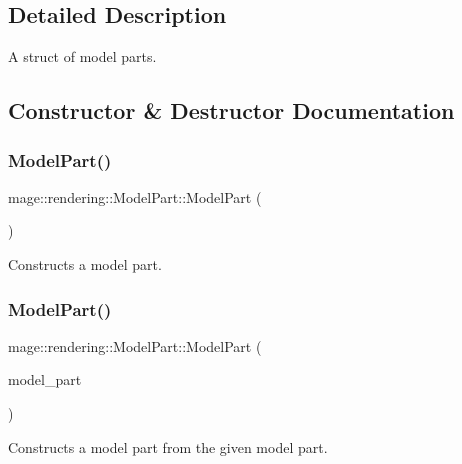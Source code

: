 \subsection{Detailed Description}
A struct of model parts. 

\subsection{Constructor \& Destructor Documentation}
\hypertarget{structmage_1_1rendering_1_1_model_part_adb7271a00583f72324ab37ab7e668689}{}\label{structmage_1_1rendering_1_1_model_part_adb7271a00583f72324ab37ab7e668689} 
\subsubsection{\texorpdfstring{Model\+Part()}{ModelPart()}\hspace{0.1cm}{\footnotesize\ttfamily [1/3]}}
{\footnotesize\ttfamily mage\+::rendering\+::\+Model\+Part\+::\+Model\+Part (\begin{DoxyParamCaption}{ }\end{DoxyParamCaption})}

Constructs a model part. \hypertarget{structmage_1_1rendering_1_1_model_part_ab9f9bbf4d5a08113483d3744b69e7188}{}\label{structmage_1_1rendering_1_1_model_part_ab9f9bbf4d5a08113483d3744b69e7188} 
\subsubsection{\texorpdfstring{Model\+Part()}{ModelPart()}\hspace{0.1cm}{\footnotesize\ttfamily [2/3]}}
{\footnotesize\ttfamily mage\+::rendering\+::\+Model\+Part\+::\+Model\+Part (\begin{DoxyParamCaption}\item[{const \hyperlink{structmage_1_1rendering_1_1_model_part}{Model\+Part} \&}]{model\+\_\+part }\end{DoxyParamCaption})\hspace{0.3cm}{\ttfamily [default]}}

Constructs a model part from the given model part.



